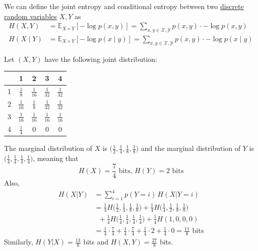     \begin{definition}
      \label{def:joint-conditional-entropy}
      We can define the joint entropy and conditional entropy between two \hyperref[prob-def:discrete-random-variable]{discrete random variables} $X, Y$ as 
      \begin{align*}
        H(X, Y) & = \mathbb{E}_{X \times Y} [-\log p(x, y)] = \sum_{x, y \in \mathcal{X}, \mathcal{Y}} p(x, y) \cdot - \log p(x, y) \\
        H(X \mid Y) & = \mathbb{E}_{X \times Y} [- \log p(x \mid y)]  = \sum_{x, y \in \mathcal{X}, \mathcal{Y}} p(x, y) \cdot - \log p(x \mid y )
      \end{align*}
    \end{definition}

    \begin{example}
      \label{ex:dice-rolls}
      Let $(X, Y)$ have the following joint distribution: 
      \begingroup
      \renewcommand{\arraystretch}{1.4}
      \begin{center}
      \begin{tabular}{c|c|c|c|c}
         &1&2&3&4\\
         \hline
        1&$\frac{1}{8}$&$\frac{1}{16}$&$\frac{1}{32}$&$\frac{1}{32}$\\
        \hline
        2&$\frac{1}{16}$&$\frac{1}{8}$&$\frac{1}{32}$&$\frac{1}{32}$\\
        \hline
        3&$\frac{1}{16}$&$\frac{1}{16}$&$\frac{1}{16}$&$\frac{1}{16}$\\
        \hline
        4&$\frac{1}{4}$&$0$&$0$&$0$
      \end{tabular}
      \end{center}
      \endgroup
      The marginal distribution of $X$ is $\big(\frac{1}{2}, \frac{1}{4}, \frac{1}{8}, \frac{1}{8}\big)$ and the marginal distribution of $Y$ is $\big(\frac{1}{4}, \frac{1}{4}, \frac{1}{4}, \frac{1}{4}\big)$, meaning that
      \begin{equation}
        H(X) = \frac{7}{4} \text{ bits,  } H(Y) = 2 \text{ bits}
      \end{equation}
      Also, 
      \begin{align*}
        H(X|Y) & = \sum_{i=1}^4 p(Y=i)\, H(X|Y = i) \\
        & = \frac{1}{4} H\bigg(\frac{1}{2}, \frac{1}{4}, \frac{1}{8}, \frac{1}{8}\bigg) + \frac{1}{4} H\bigg(\frac{1}{4}, \frac{1}{2}, \frac{1}{8}, \frac{1}{8}\bigg) \\
        & \;\; + \frac{1}{4} H\bigg(\frac{1}{4}, \frac{1}{4}, \frac{1}{4}, \frac{1}{4}\bigg) + \frac{1}{4}H(1, 0, 0, 0) \\
        & = \frac{1}{4} \cdot \frac{7}{4} + \frac{1}{4} \cdot \frac{7}{4} + \frac{1}{4} \cdot 2 + \frac{1}{4} \cdot 0 = \frac{11}{8} \text{ bits}
      \end{align*}
      Similarly, $H(Y|X) = \frac{13}{8}$ bits and $H(X, Y) = \frac{27}{8}$ bits. 
    \end{example}

